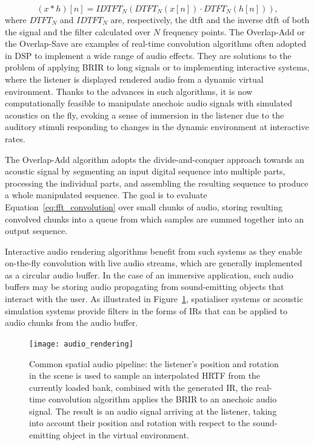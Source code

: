 \begin{equation}
    (x * h)[n] = IDTFT_N( DTFT_N(x[n]) \cdot DTFT_N(h[n]) ),
    \label{eq:fft_convolution}
\end{equation}
where $DTFT_N$ and $IDTFT_N$ are, respectively, the \acrshort{dtft} and the inverse \acrshort{dtft} of both the signal and the filter calculated over $N$ frequency points.
The Overlap-Add or the Overlap-Save are examples of real-time convolution algorithms often adopted in DSP to implement a wide range of audio effects. They are solutions to the problem of applying BRIR to long signals or to implementing interactive systems, where the listener is displayed rendered audio from a dynamic virtual environment. Thanks to the advances in such algorithms, it is now computationally feasible to manipulate anechoic audio signals with simulated acoustics on the fly, evoking a sense of immersion in the listener due to the auditory stimuli responding to changes in the dynamic environment at interactive rates.\par
The Overlap-Add algorithm adopts the divide-and-conquer approach towards an acoustic signal by segmenting an input digital sequence into multiple parts, processing the individual parts, and assembling the resulting sequence to produce a whole manipulated sequence. The goal is to evaluate Equation~\ref{eq:fft_convolution} over small chunks of audio, storing resulting convolved chunks into a queue from which samples are summed together into an output sequence.\par
Interactive audio rendering algorithms benefit from such systems as they enable on-the-fly convolution with live audio streams, which are generally implemented as a circular audio buffer. In the case of an immersive application, such audio buffers may be storing audio propagating from sound-emitting objects that interact with the user. As illustrated in Figure~\ref{fig:audio_rendering_chain}, spatialiser systems or acoustic simulation systems provide filters in the forms of IRs that can be applied to audio chunks from the audio buffer.
\begin{figure}
    \centering
    \texttt{[image: audio\_rendering]}
    \caption[Standard audio rendering pipeline]{Common spatial audio pipeline: the listener's position and rotation in the scene is used to sample an interpolated HRTF from the currently loaded bank, combined with the generated IR, the real-time convolution algorithm applies the BRIR to an anechoic audio signal. The result is an audio signal arriving at the listener, taking into account their position and rotation with respect to the sound-emitting object in the virtual environment.}
    \label{fig:audio_rendering_chain}
\end{figure}

